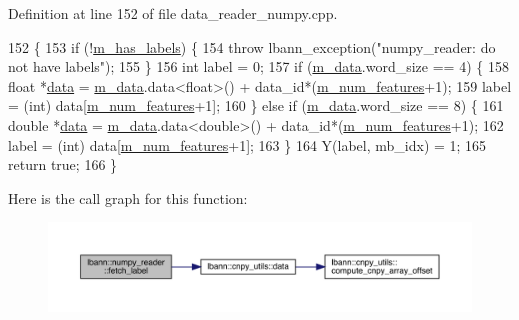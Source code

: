 Definition at line 152 of file data\+\_\+reader\+\_\+numpy.\+cpp.


\begin{DoxyCode}
152                                                                        \{
153   \textcolor{keywordflow}{if} (!\hyperlink{classlbann_1_1numpy__reader_a0e8caa5609e706bf909b78c4c35377b8}{m\_has\_labels}) \{
154     \textcolor{keywordflow}{throw} lbann\_exception(\textcolor{stringliteral}{"numpy\_reader: do not have labels"});
155   \}
156   \textcolor{keywordtype}{int} label = 0;
157   \textcolor{keywordflow}{if} (\hyperlink{classlbann_1_1numpy__reader_a6d43a1eae0fedb6fa237b24cef8f37fa}{m\_data}.word\_size == 4) \{
158     \textcolor{keywordtype}{float} *\hyperlink{namespacelbann_1_1cnpy__utils_a9ac86d96ccb1f8b4b2ea16441738781f}{data} = \hyperlink{classlbann_1_1numpy__reader_a6d43a1eae0fedb6fa237b24cef8f37fa}{m\_data}.data<\textcolor{keywordtype}{float}>() + data\_id*(\hyperlink{classlbann_1_1numpy__reader_aef25f95077f565fa9616ec353b93f675}{m\_num\_features}+1);
159     label = (int) data[\hyperlink{classlbann_1_1numpy__reader_aef25f95077f565fa9616ec353b93f675}{m\_num\_features}+1];
160   \} \textcolor{keywordflow}{else} \textcolor{keywordflow}{if} (\hyperlink{classlbann_1_1numpy__reader_a6d43a1eae0fedb6fa237b24cef8f37fa}{m\_data}.word\_size == 8) \{
161     \textcolor{keywordtype}{double} *\hyperlink{namespacelbann_1_1cnpy__utils_a9ac86d96ccb1f8b4b2ea16441738781f}{data} = \hyperlink{classlbann_1_1numpy__reader_a6d43a1eae0fedb6fa237b24cef8f37fa}{m\_data}.data<\textcolor{keywordtype}{double}>() + data\_id*(\hyperlink{classlbann_1_1numpy__reader_aef25f95077f565fa9616ec353b93f675}{m\_num\_features}+1);
162     label = (int) data[\hyperlink{classlbann_1_1numpy__reader_aef25f95077f565fa9616ec353b93f675}{m\_num\_features}+1];
163   \}
164   Y(label, mb\_idx) = 1;
165   \textcolor{keywordflow}{return} \textcolor{keyword}{true};
166 \}
\end{DoxyCode}
Here is the call graph for this function\+:\nopagebreak
\begin{figure}[H]
\begin{center}
\leavevmode
\includegraphics[width=350pt]{classlbann_1_1numpy__reader_a67691517fc4da98ca95dfc934e847067_cgraph}
\end{center}
\end{figure}
